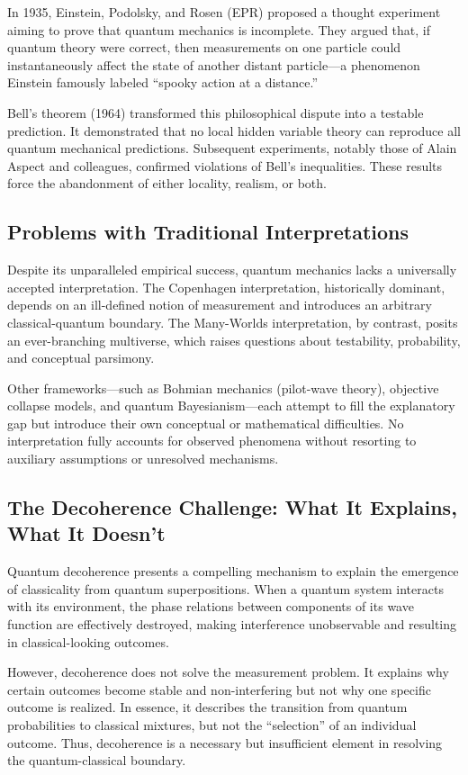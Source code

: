 \documentclass[12pt]{article}
\begin{document}
In 1935, Einstein, Podolsky, and Rosen (EPR) proposed a thought experiment aiming to prove that quantum mechanics is incomplete. They argued that, if quantum theory were correct, then measurements on one particle could instantaneously affect the state of another distant particle—a phenomenon Einstein famously labeled “spooky action at a distance.”

Bell’s theorem (1964) transformed this philosophical dispute into a testable prediction. It demonstrated that no local hidden variable theory can reproduce all quantum mechanical predictions. Subsequent experiments, notably those of Alain Aspect and colleagues, confirmed violations of Bell’s inequalities. These results force the abandonment of either locality, realism, or both.

\subsection{Problems with Traditional Interpretations}

Despite its unparalleled empirical success, quantum mechanics lacks a universally accepted interpretation. The Copenhagen interpretation, historically dominant, depends on an ill-defined notion of measurement and introduces an arbitrary classical-quantum boundary. The Many-Worlds interpretation, by contrast, posits an ever-branching multiverse, which raises questions about testability, probability, and conceptual parsimony.

Other frameworks—such as Bohmian mechanics (pilot-wave theory), objective collapse models, and quantum Bayesianism—each attempt to fill the explanatory gap but introduce their own conceptual or mathematical difficulties. No interpretation fully accounts for observed phenomena without resorting to auxiliary assumptions or unresolved mechanisms.

\subsection{The Decoherence Challenge: What It Explains, What It Doesn't}

Quantum decoherence presents a compelling mechanism to explain the emergence of classicality from quantum superpositions. When a quantum system interacts with its environment, the phase relations between components of its wave function are effectively destroyed, making interference unobservable and resulting in classical-looking outcomes.

However, decoherence does not solve the measurement problem. It explains why certain outcomes become stable and non-interfering but not why one specific outcome is realized. In essence, it describes the transition from quantum probabilities to classical mixtures, but not the “selection” of an individual outcome. Thus, decoherence is a necessary but insufficient element in resolving the quantum-classical boundary.
\end{document}
